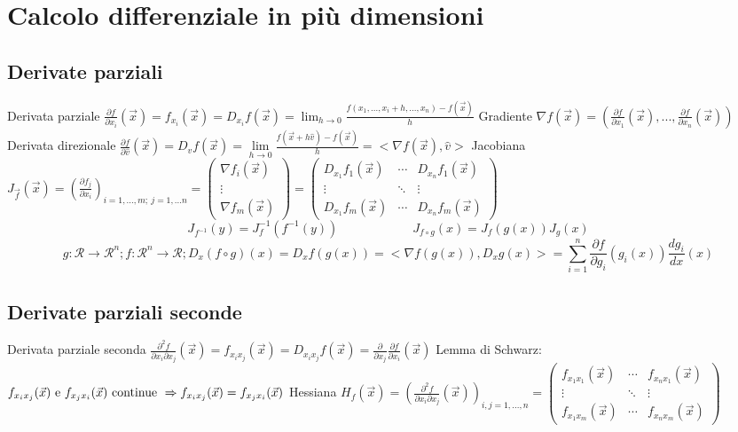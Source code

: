 \documentclass[]{article}
\newcommand{\ux}{\vec{x}}
\newcommand{\uf}{\vec{f}}
\newcommand{\cfi}[1]{f_{x_{#1}}(\ux)}
\newcommand{\pfi}[1]{\frac{\partial f}{\partial x_{#1}}(\ux)}
\newcommand{\dfi}[1]{D_{x_{#1}}f(\ux)}
\newcommand{\scfi}[2]{f_{x_{#1}x_{#2}}(\ux)}
\newcommand{\spfi}[2]{\frac{\partial^2 f}{\partial x_{#1} \partial x_{#2}}(\ux)}
\newcommand{\sdfi}[2]{D_{x_{#1}x_{#2}}f(\ux)}
\begin{document}
\section{Calcolo differenziale in più dimensioni}
\subsection{Derivate parziali}

Derivata parziale \(\pfi{i}=\cfi{i}=\dfi{i}=\lim_{h\to 0}{\frac{f(x_{1},...,x_{i}+h,...,x_{n})-f(\ux)}{h}}\) \newline
Gradiente \(\nabla f(\ux)=\left(\pfi{1},...,\pfi{n}\right)\) \newline
Derivata direzionale \(\frac{\partial f}{\partial \hat{v}}(\ux)=D_vf(\ux)=\lim\limits_{h\to0}\frac{f(\ux+h\hat{v})-f(\ux)}{h}=<\nabla f(\ux),\hat{v}>\) \newline
Jacobiana \(J_{\uf}(\ux)=\left(\frac{\partial f_{j}}{\partial x_{i}}\right)_{i=1,...,m; \ j=1,...n}=\begin{pmatrix}
\nabla f_{i}(\ux) \\
\vdots\\
\nabla f_{m}(\ux)
\end{pmatrix} = \begin{pmatrix}
D_{x_{1}}f_1(\ux) & \cdots & D_{x_{n}}f_1(\ux) \\
\vdots & \ddots & \vdots \\
D_{x_{1}}f_m(\ux) & \cdots & D_{x_{n}}f_m(\ux)
\end{pmatrix}
\)
\[J_{f^{-1}}(y)=J_f^{-1}(f^{-1}(y)) \qquad\qquad\qquad 
J_{f\circ g}(x)=J_f(g(x))J_g(x)\]
\[g:\mathcal{R}\to \mathcal{R}^n; f:\mathcal{R}^n\to\mathcal{R}; D_x (f\circ g)(x)=D_x f(g(x))=<\nabla f(g(x)),D_x g(x)>=\sum_{i=1}^{n}{\frac{\partial f}{\partial g_i}(g_i(x))\frac{dg_i}{dx}(x)}\]

\subsection{Derivate parziali seconde}
Derivata parziale seconda \(\spfi{i}{j}=\scfi{i}{j}=\sdfi{i}{j}=\frac{\partial}{\partial x_{j}}\pfi{i}\) \newline
Lemma di Schwarz: \(\scfi{i}{j} \textnormal{ e } \scfi{j}{i} \textnormal{ continue } \Rightarrow \scfi{i}{j}=\scfi{j}{i}\) \newline
Hessiana \(H_{f}(\ux)=\left(\spfi{i}{j}\right)_{i,j=1,...,n} = \begin{pmatrix}
\scfi{1}{1} & \cdots & \scfi{n}{1} \\
\vdots & \ddots & \vdots \\
\scfi{1}{m} & \cdots & \scfi{n}{m}
\end{pmatrix}\)
\end{document}

